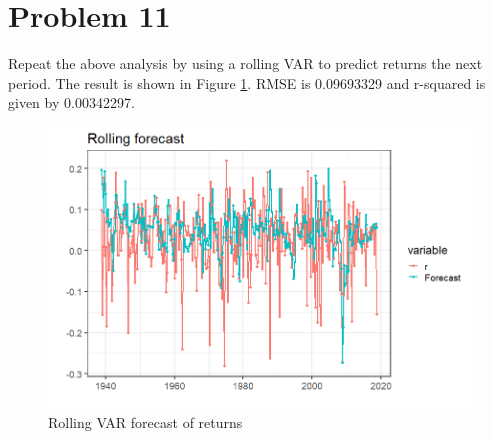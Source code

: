 \documentclass[11pt,letter]{article}
\begin{document}
\section*{Problem 11} 
Repeat the above analysis by using a rolling VAR to predict returns the next period. The result is shown in Figure \ref{fig:rolling_forecast}. RMSE is 0.09693329 and r-squared is given by 0.00342297. 
\begin{figure}[!htb]
	\centering
	\includegraphics[scale = 0.5]{rolling_forecast.png}
	\caption{Rolling VAR forecast of returns}
	\label{fig:rolling_forecast}
\end{figure}
\end{document}
